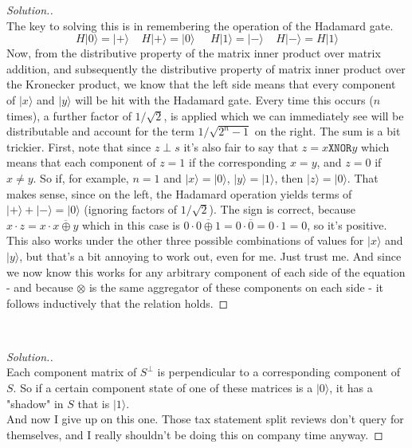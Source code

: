 \documentclass[12pt]{article}
\newenvironment{problem}[2][Problem]{\begin{trivlist}
\item[\hskip \labelsep {\bfseries #1}\hskip \labelsep {\bfseries #2.}]}{\end{trivlist}}
\begin{document}
\begin{proof}[Solution.]~\\
The key to solving this is in remembering the operation of the Hadamard gate.
$$H|0\rangle=|+\rangle\;\;\;\;H|+\rangle=|0\rangle\;\;\;\;\;H|1\rangle=|-\rangle\;\;\;\;H|-\rangle=H|1\rangle$$
Now, from the distributive property of the matrix inner product over matrix addition, and
subsequently the distributive property of matrix inner product over the Kronecker product, we
know that the left side means that every component of $|x\rangle$ and $|y\rangle$ will be hit
with the Hadamard gate. Every time this occurs ($n$ times), a further factor of $1/\sqrt{2}$,
is applied which we can immediately see will be distributable and account for the term
$1/\sqrt{2^n-1}$ on the right. The sum is a bit trickier. First, note that since $z\perp s$
it's also fair to say that $z=x\texttt{XNOR}y$ which means that
each component of $z=1$ if the corresponding $x=y$, and $z=0$ if $x\neq y$. So if, for
example, $n=1$ and $|x\rangle=|0\rangle$, $|y\rangle=|1\rangle$, then $|z\rangle=|0\rangle$.
That makes sense, since on the left, the Hadamard operation yields terms of $|+\rangle+|
-\rangle=|0\rangle$ (ignoring factors of $1/\sqrt{2}$). The sign is correct, because $x\cdot
z=x\cdot\overline{x\oplus y}$ which in this case is
$0\cdot\overline{0\oplus1}=0\cdot\overline{0}=0\cdot1=0$, so it's positive. This also works
under the other three possible combinations of values for $|x\rangle$ and $|y\rangle$, but
that's a bit annoying to work out, even for me. Just trust me. And since we now know this
works for any arbitrary component of each side of the equation - and because $\otimes$ is the
same aggregator of these components on each side - it follows inductively that the relation
holds.
\end{proof}

\begin{problem}{6.5.2}~\\
\begin{proof}[Solution.]~\\
Each component matrix of $S^\perp$ is perpendicular to a corresponding component of $S$. So if a certain component state of one of these matrices is a $|0\rangle$, it has a "shadow" in $S$ that is $|1\rangle$.\\
And now I give up on this one. Those tax statement split reviews don't query for themselves, and I really shouldn't be doing this on company time anyway.
\end{proof}
\end{problem}
\end{document}
